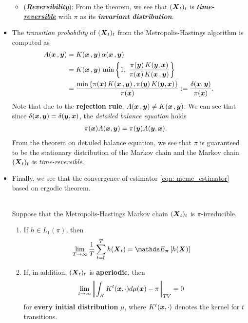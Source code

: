 \documentclass[11pt]{article}
\begin{document}
\begin{itemize}
\begin{itemize}
\item (\textbf{\emph{Reversibility}}):  From the theorem, we see that $(\boldsymbol{X}_t)_t$ is \underline{\emph{\textbf{time-reversible}}} with $\pi$ as its \emph{\textbf{invariant distribution}}.
\end{itemize}

\item The \emph{transition probability} of $(\boldsymbol{X}_t)_t$ from the Metropolis-Hastings algorithm is computed as 
\begin{align}
A(\boldsymbol{x}\,, \boldsymbol{y}) &= K(\boldsymbol{x}\,, \boldsymbol{y})\,\alpha(\boldsymbol{x}\,, \boldsymbol{y}) \nonumber\\
&= K(\boldsymbol{x}\,, \boldsymbol{y})\,\min\left\{1, \; \frac{\pi(\boldsymbol{y})\,K(\boldsymbol{y}, \boldsymbol{x})}{\pi(\boldsymbol{x})\,K(\boldsymbol{x}\,, \boldsymbol{y})} \right\}\nonumber\\
&= \frac{\min\left\{\pi(\boldsymbol{x})\,K(\boldsymbol{x}\,, \boldsymbol{y})\,, \pi(\boldsymbol{y})\,K(\boldsymbol{y}, \boldsymbol{x})\right\}}{\pi(\boldsymbol{x})} := \frac{\delta(\boldsymbol{x}, \boldsymbol{y})}{\pi(\boldsymbol{x})}. \label{eqn: mh_transition_prob}
\end{align} Note that due to the \textbf{rejection rule}, $A(\boldsymbol{x}\,, \boldsymbol{y}) \neq K(\boldsymbol{x}\,, \boldsymbol{y})$. We can see that since $\delta(\boldsymbol{x}, \boldsymbol{y}) = \delta(\boldsymbol{y}, \boldsymbol{x})$, the \emph{detailed balance equation} holds
\begin{align}
\pi(\boldsymbol{x})A(\boldsymbol{x}, \boldsymbol{y}) &= \pi(\boldsymbol{y})A(\boldsymbol{y}, \boldsymbol{x}). \label{eqn: mh_detail_balance_equation}
\end{align} From the theorem on detailed balance equation, we see that $\pi$ is guaranteed to be the stationary distribution of the Markov chain and the Markov chain $(\boldsymbol{X}_t)_t$ is \emph{time-reversible}.


\item Finally, we see that the convergence of estimator \eqref{eqn: mcmc_estimator} based on ergodic theorem.
\begin{theorem}\label{thm: mh_convergence}\citep{robert1999monte}\\
Suppose that the Metropolis-Hastings Markov chain $(\boldsymbol{X}_t)_t$ is $\pi$-irreducible. 
\begin{enumerate}
\item If $h \in L_1(\pi)$, then 
\begin{align}
\lim_{T\rightarrow \infty}\frac{1}{T}\sum_{t=0}^{T}h(\mb{X}_t) &= \E{\mb{\pi}}{h(\mb{X})} \label{eqn: mh_convergence}
\end{align}

\item If, in addition, $(\boldsymbol{X}_t)_t$ is \textbf{aperiodic}, then 
\begin{align}
\lim_{t\rightarrow \infty}\left\|\int_{{\mathcal X}}K^{t}(\boldsymbol{x},\cdot)d\mu(\boldsymbol{x}) - \pi \right\|_{TV} &= 0  \label{eqn: mh_convergence_total_variation}
\end{align} for \textbf{every initial distribution} $\mu$, where $K^{t}(\boldsymbol{x},\cdot)$ denotes the kernel for $t$ transitions.
\end{enumerate}
\end{theorem}


\end{itemize}
\end{document}
